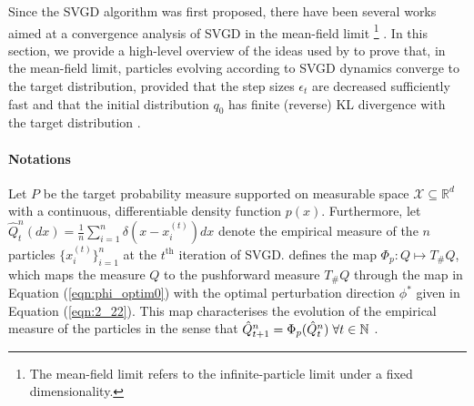 Since the SVGD algorithm was first proposed, there have been several works aimed at a convergence analysis of SVGD in the mean-field limit \footnote{The mean-field limit refers to the infinite-particle limit under a fixed dimensionality.} \citep[e.g.,][]{liu_svgd_gf, lu_svgd_scaling, gorham_stochastic_sd, salim_convergence}. In this section, we provide a high-level overview of the ideas used by \citet{liu_svgd_gf} to prove that, in the mean-field limit, particles evolving according to SVGD dynamics converge to the target distribution, provided that the step sizes $\epsilon_t$ are decreased sufficiently fast and that the initial distribution $q_0$ has finite (reverse) KL divergence with the target distribution \citep{liu_svgd_gf}.

\paragraph*{Notations} Let $P$ be the target probability measure supported on measurable space $\mathcal{X} \subseteq \mathbb{R}^d$ with a continuous, differentiable density function $p(x)$. Furthermore, let $\hat{Q}_t^n(dx) = \frac{1}{n}\sum_{i=1}^n \delta(x - x_i^{(t)})dx$ denote the empirical measure of the $n$ particles $\{x_i^{(t)}\}_{i=1}^n$ at the $t^\text{th}$ iteration of SVGD. \citet{liu_svgd_gf} defines the map $\Phi_p: Q \mapsto T_{\#}Q$, which maps the measure $Q$ to the pushforward measure $T_{\#}Q$ through the map in Equation (\ref{eqn:phi_optim0}) with the optimal perturbation direction $\phi^*$ given in Equation (\ref{eqn:2_22}). This map characterises the evolution of the empirical measure of the particles in the sense that $\hat{Q}_{t+1}^n = \Phi_p(\hat{Q}_t^n) \hspace{0.1cm}\forall t \in \mathbb{N}$ \citep{liu_svgd_gf}.

